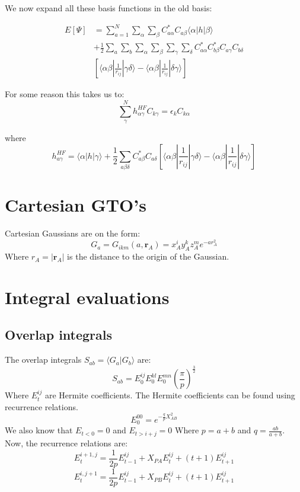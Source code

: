\documentclass[a4paper,10pt, twocolumn, pre]{revtex4}
\newcommand{\rvec}{\mathbf{r}}
\newcommand{\overlap}[2]{\langle {#1}|{#2} \rangle}
\begin{document}
We now expand all these basis functions in the old basis:

\begin{align}
	E[\Psi] &= \sum_{a=1}^N \sum_\alpha \sum_\beta C_{a\alpha}^* C_{a\beta}\langle \alpha |h|\beta\rangle
	\nonumber \\
	&+
	\frac{1}{2} \sum_a \sum_b \sum_\alpha \sum_\beta \sum_\gamma \sum_\delta 
	C^*_{a\alpha} C^*_{b\beta} C_{a\gamma} C_{b\delta} \\
	&\left[  \langle \alpha\beta |\frac{1}{r_{ij}}|\gamma\delta \rangle - \langle \alpha\beta | \frac{1}{r_{ij} }| \delta\gamma \rangle \right]
\end{align}

For some reason this takes us to:
\begin{equation}
	\sum_\gamma^N h_{\alpha\gamma}^{HF} C_{k\gamma} = \epsilon_k C_{k\alpha}
\end{equation}

where 
\begin{equation}
	h_{a\gamma}^{HF} = \langle \alpha |h|\gamma\rangle + \frac{1}{2}\sum_{a \beta \delta}  C^*_{a\beta}C_{a\delta} \left[ 
	\langle\alpha \beta|\frac{1}{r_{ij}}| \gamma \delta \rangle
	-
	\langle\alpha \beta|\frac{1}{r_{ij}}| \delta \gamma \rangle
	\right]
\end{equation}

\section{Cartesian GTO's}
Cartesian Gaussians are on the form:
\begin{equation}
	G_a = G_{ikm}(a, \rvec_A) = x^i_A y^k_A z^m_A e^{-ar^2_A}
\end{equation}
Where $r_A = |\rvec_A|$ is the distance to the origin of the Gaussian.

\section{Integral evaluations}
\subsection{Overlap integrals}
The overlap integrals $S_{ab} = \overlap{G_a}{G_b}$ are:
\begin{equation}
	S_{ab} = E_0^{ij}E_0^{kl}E_0^{mn}\left(\frac{\pi}{p}\right)^{\frac{3}{2}}
\end{equation}
Where $E_t^{ij}$ are Hermite coefficients. 
The Hermite coefficients can be found using recurrence relations. 
\begin{equation}
	E_0^{00} = e^{-\frac{q}{p}X_{AB}^2}
\end{equation}
We also know that $E_{t<0} = 0$ and $E_{t>i+j} = 0$
Where $p = a+b$ and $q = \frac{ab}{a+b}$.
Now, the recurrence relations are:
\begin{equation}
	E_t^{i+1,j} = \frac{1}{2p}E_{t-1}^{ij} + X_{PA}E_t^{ij} + (t+1) E_{t+1}^{ij}
\end{equation}
\begin{equation}
	E_t^{i, j+1} = \frac{1}{2p}E_{t-1}^{ij}+X_{PB}E_t^{ij} + (t+1)E_{t+1}^{ij}
\end{equation}
\end{document}

